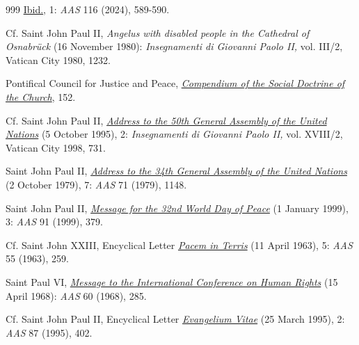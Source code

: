 \documentclass{article}
\begin{document}
\begin{thebibliography}{999}
 \href{https://www.vatican.va/roman_curia/congregations/cfaith/documents/rc_ddf_doc_20240402_dignitas-infinita_en.html}{Ibid.}, 1: \emph{AAS} 116 (2024), 589-590.

 Cf. Saint John Paul II, \emph{Angelus with disabled people in the Cathedral of Osnabrück} (16 November 1980): \emph{Insegnamenti di Giovanni Paolo II,} vol. III/2, Vatican City 1980, 1232.

 Pontifical Council for Justice and Peace, \href{https://www.vatican.va/roman_curia/pontifical_councils/justpeace/documents/rc_pc_justpeace_doc_20060526_compendio-dott-soc_en.html}{\emph{Compendium of the Social Doctrine of the Church}}, 152.

 Cf. Saint John Paul II, \href{https://www.vatican.va/content/john-paul-ii/en/speeches/1995/october/documents/hf_jp-ii_spe_05101995_address-to-uno.html}{\emph{Address to the 50th General Assembly of the United Nations}} (5 October 1995), 2: \emph{Insegnamenti di Giovanni Paolo II,} vol. XVIII/2, Vatican City 1998, 731.

 Saint John Paul II, \href{https://www.vatican.va/content/john-paul-ii/en/speeches/1979/october/documents/hf_jp-ii_spe_19791002_general-assembly-onu.html}{\emph{Address to the 34th General Assembly of the United Nations}} (2 October 1979), 7: \emph{AAS} 71 (1979), 1148.

 Saint John Paul II, \href{https://www.vatican.va/content/john-paul-ii/en/messages/peace/documents/hf_jp-ii_mes_14121998_xxxii-world-day-for-peace.html}{\emph{Message for the 32nd World Day of Peace}} (1 January 1999), 3: \emph{AAS} 91 (1999), 379.

 Cf. Saint John XXIII, Encyclical Letter \href{https://www.vatican.va/content/john-xxiii/en/encyclicals/documents/hf_j-xxiii_enc_11041963_pacem.html}{\emph{Pacem in Terris}} (11 April 1963), 5: \emph{AAS} 55 (1963), 259.

 Saint Paul VI, \href{https://www.vatican.va/content/paul-vi/en/messages/pont-messages/documents/hf_p-vi_mess_19680415_confer-teheran.html}{\emph{Message to the International Conference on Human Rights}} (15 April 1968): \emph{AAS} 60 (1968), 285.

 Cf. Saint John Paul II, Encyclical Letter \href{https://www.vatican.va/content/john-paul-ii/en/encyclicals/documents/hf_jp-ii_enc_25031995_evangelium-vitae.html}{\emph{Evangelium Vitae}} (25 March 1995), 2: \emph{AAS} 87 (1995), 402.


\end{thebibliography}
\end{document}
